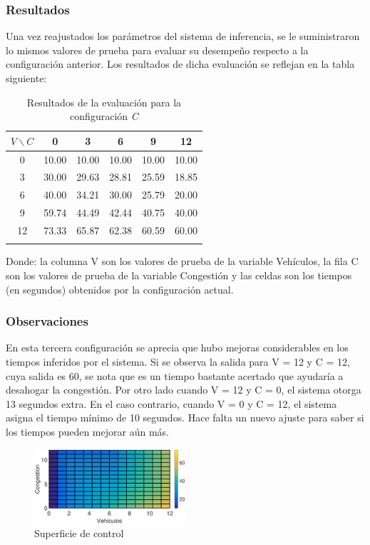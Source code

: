 \pagebreak
\subsubsection{Resultados}
Una vez reajustados los parámetros del sistema de inferencia, se le suministraron lo mismos valores de prueba para evaluar su desempeño respecto a la configuración anterior. Los resultados de dicha evaluación se reflejan en la tabla siguiente:

\begin{longtable}[c]{cccccc} \toprule
	$V \backslash C$ &  0 & 3 & 6 & 9 & 12 \\ \midrule
	0 & 10.00 & 10.00 & 10.00 & 10.00 & 10.00 \\
	3 & 30.00 & 29.63 & 28.81 & 25.59 & 18.85 \\
	6 & 40.00 & 34.21 & 30.00 & 25.79 & 20.00 \\
	9 & 59.74 & 44.49 & 42.44 & 40.75 & 40.00 \\
	12& 73.33 & 65.87 & 62.38 & 60.59 & 60.00 \\
	\caption{Resultados de la evaluación para la configuración \textit{C}}
\end{longtable}

Donde: la columna V son los valores de prueba de la variable Vehículos, la fila C son los valores de  prueba de la variable Congestión y las celdas son los tiempos (en segundos) obtenidos por la configuración actual.

\subsubsection{Observaciones}
\begin{multicols}{2}

	En esta tercera configuración se aprecia que hubo mejoras considerables en los tiempos inferidos por el sistema. Si se observa la salida para V = 12 y C = 12, cuya salida es 60, se nota que es un tiempo bastante acertado que ayudaría a desahogar la congestión. Por otro lado cuando V = 12 y C = 0, el sistema otorga 13 segundos extra. En el caso contrario, cuando V = 0 y C = 12, el sistema asigna el tiempo mínimo de 10 segundos. Hace falta un nuevo ajuste para saber si los tiempos pueden mejorar aún más.
	
	\begin{figure}[H]
		\includegraphics[width=0.5\textwidth]{Surfaces/Surface2D_C.eps}
		\caption{Superficie de control}
	\end{figure}
\end{multicols}
\pagebreak





